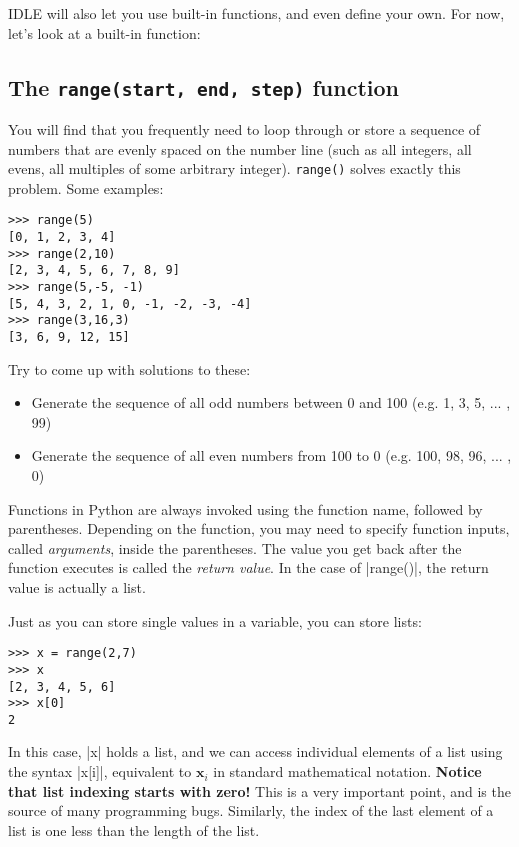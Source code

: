 \documentclass{article}
\begin{document}
IDLE will also let you use built-in functions, and even define your own.  For
now, let's look at a built-in function:

\subsection{The \texttt{range(start, end, step)} function}
You will find that you frequently need to loop through or store a sequence
of numbers that are evenly spaced on the number line (such as all integers, all
evens, all multiples of some arbitrary integer).  \texttt{range()} solves exactly this problem.  Some examples:

\begin{Verbatim}
>>> range(5)
[0, 1, 2, 3, 4]
>>> range(2,10)
[2, 3, 4, 5, 6, 7, 8, 9]
>>> range(5,-5, -1)
[5, 4, 3, 2, 1, 0, -1, -2, -3, -4]
>>> range(3,16,3)
[3, 6, 9, 12, 15]
\end{Verbatim}

Try to come up with solutions to these:
\begin{itemize}
 \item Generate the sequence of all odd numbers between 0 and 100 (e.g. 1, 3, 5,
... , 99)
 \item Generate the sequence of all even numbers from 100 to 0 (e.g. 100, 98,
96, ... , 0)
\end{itemize}

Functions in Python are always invoked using the function name, followed by parentheses.  Depending on the function, you may need to specify
function inputs, called \textit{arguments}, inside the parentheses.  The value you get back after the function executes is
called the \textit{return value}.  In the case of |range()|, the return value is actually a list.

\pagebreak

Just as you can store single values in a variable, you can store lists:

\begin{Verbatim}
>>> x = range(2,7)
>>> x
[2, 3, 4, 5, 6]
>>> x[0]
2
\end{Verbatim}

In this case, |x| holds a list, and we can access individual elements of a list
using the syntax |x[i]|, equivalent to $\textbf{x}_{i}$ in standard mathematical
notation.  \textbf{Notice that list indexing starts with zero!}  This is a very
important point, and is the source of many programming bugs.  Similarly, the
index of the last element of a list is one less than the length of the list.
\end{document}
